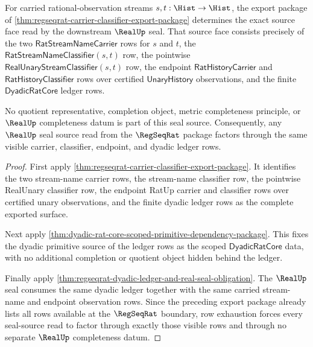 \begin{theorem}
\label{thm:regseqrat-export-real-seal-source-determinacy}
For carried rational-observation streams $s,t:\Hist\to\Hist$, the export
package of
\autoref{thm:regseqrat-carrier-classifier-export-package} determines the exact
source face read by the downstream $\RealUp$ seal. That source face consists
precisely of the two $\mathsf{RatStreamNameCarrier}$ rows for $s$ and $t$, the
$\mathsf{RatStreamNameClassifier}(s,t)$ row, the pointwise
$\mathsf{RealUnaryStreamClassifier}(s,t)$ row, the endpoint
$\mathsf{RatHistoryCarrier}$ and $\mathsf{RatHistoryClassifier}$ rows over
certified $\mathsf{UnaryHistory}$ observations, and the finite
$\mathsf{DyadicRatCore}$ ledger rows.

No quotient representative, completion object, metric completeness principle,
or $\RealUp$ completeness datum is part of this seal source. Consequently, any
$\RealUp$ seal source read from the $\RegSeqRat$ package factors through the
same visible carrier, classifier, endpoint, and dyadic ledger rows.
\end{theorem}
\begin{proof}
First apply
\autoref{thm:regseqrat-carrier-classifier-export-package}. It identifies the
two stream-name carrier rows, the stream-name classifier row, the pointwise
RealUnary classifier row, the endpoint RatUp carrier and classifier rows over
certified unary observations, and the finite dyadic ledger rows as the complete
exported surface.

Next apply
\autoref{thm:dyadic-rat-core-scoped-primitive-dependency-package}. This fixes
the dyadic primitive source of the ledger rows as the scoped
$\mathsf{DyadicRatCore}$ data, with no additional completion or quotient
object hidden behind the ledger.

Finally apply
\autoref{thm:regseqrat-dyadic-ledger-and-real-seal-obligation}. The $\RealUp$
seal consumes the same dyadic ledger together with the same carried stream-name
and endpoint observation rows. Since the preceding export package already
lists all rows available at the $\RegSeqRat$ boundary, row exhaustion forces
every seal-source read to factor through exactly those visible rows and through
no separate $\RealUp$ completeness datum.
\end{proof}


